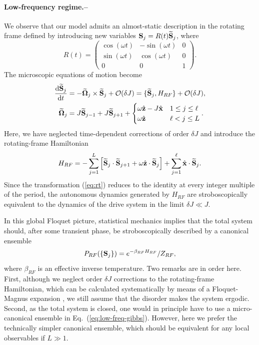 \documentclass[prl,aps,twocolumn,notitlepage,10pt]{revtex4-1}
\def\d{\mathrm{d}}
\newcommand{\be}{\begin{equation}}
\newcommand{\ee}{\end{equation}}
\newcommand{\beA}{\begin{equation}\begin{aligned}}
\newcommand{\eeA}{\end{aligned}\end{equation}}
\begin{document}
\paragraph{Low-frequency regime.--} \label{sec:low-frequency}
We observe that our model admits an almost-static description in the
rotating frame defined by introducing new variables
${\bf S}_j = R(t)\widetilde{\bf S}_j$,
where
\be
R(t) = 
\begin{pmatrix} 
\cos (\omega t) & -\sin (\omega t) & 0 \\ 
\sin (\omega t) & \cos (\omega t) & 0 \\ 
0 & 0 & 1
\end{pmatrix}.
\label{eq:rt}
\ee
The microscopic equations of motion become
\beA
\frac{\d \widetilde{\bf S}_j}{\d t}
&= - \widetilde{\boldsymbol\Omega}_j \times \widetilde{\bf S}_j + \mathcal{O}(\delta J)
= \{ \widetilde{\bf S}_j, H_{RF} \} + \mathcal{O}(\delta J),\\
\widetilde{\boldsymbol\Omega}_j &= J \widetilde{\bf S}_{j-1}
+ J \widetilde{\bf S}_{j+1}
+ \begin{cases}  \omega \hat{\bf z} - J \hat{\bf x}  & 1\leq j \leq \ell \\ \omega \hat{\bf z} & \ell < j \leq L \end{cases}.
\eeA
Here, we have neglected time-dependent corrections of order $\delta J$ and
introduce the rotating-frame Hamiltonian
\be
H_{RF} = -\sum_{j=1}^L \left[\widetilde{\bf S}_j \cdot \widetilde{\bf S}_{j+1}
  + \omega\hat{\bf z}\cdot \widetilde{\bf S}_j \right]
+ \sum_{j=1}^\ell \hat{\bf x} \cdot \widetilde{\bf S}_j
.
\ee
Since the transformation (\ref{eq:rt}) reduces to the identity at every integer
multiple of the period, the autonomous dynamics generated by $H_{RF}$ are
stroboscopically equivalent to the dynamics of the drive system in the limit
$\delta J \ll J$.

In this global Floquet picture, statistical mechanics implies that the total
system should, after some transient phase, be stroboscopically described by a
canonical ensemble
\be
P_{RF}(\{{\bf S}_j\}) = e^{-\beta_{RF} H_{RF}}/Z_{RF},
\label{eq:low-freq-gibbs}
\ee
where $\beta_{RF}$ is an effective inverse temperature.
Two remarks are in order here.
First, although we neglect order $\delta J$ corrections to the rotating-frame
Hamiltonian, which can be calculated systematically by means of a
Floquet-Magnus expansion \cite{long-paper}, we still assume that the disorder
makes the system ergodic.
Second, as the total system is closed, one would in principle have to use a
micro-canonical ensemble in Eq.~(\ref{eq:low-freq-gibbs}). However, here we
prefer the technically simpler canonical ensemble, which should be equivalent
for any local observables if $L\gg 1$.
\end{document}
